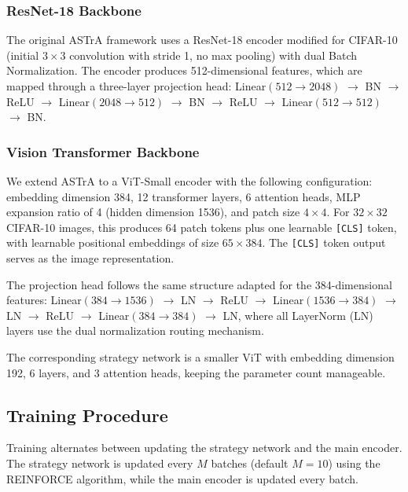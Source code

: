 \documentclass[conference]{IEEEtran}
\begin{document}
\subsubsection{ResNet-18 Backbone}
The original ASTrA framework uses a ResNet-18 encoder modified for CIFAR-10 (initial $3 \times 3$ convolution with stride 1, no max pooling) with dual Batch Normalization. The encoder produces 512-dimensional features, which are mapped through a three-layer projection head: Linear$(512 \rightarrow 2048)$ $\rightarrow$ BN $\rightarrow$ ReLU $\rightarrow$ Linear$(2048 \rightarrow 512)$ $\rightarrow$ BN $\rightarrow$ ReLU $\rightarrow$ Linear$(512 \rightarrow 512)$ $\rightarrow$ BN.

\subsubsection{Vision Transformer Backbone}
We extend ASTrA to a ViT-Small encoder with the following configuration: embedding dimension 384, 12 transformer layers, 6 attention heads, MLP expansion ratio of 4 (hidden dimension 1536), and patch size $4 \times 4$. For $32 \times 32$ CIFAR-10 images, this produces 64 patch tokens plus one learnable \texttt{[CLS]} token, with learnable positional embeddings of size $65 \times 384$. The \texttt{[CLS]} token output serves as the image representation.

The projection head follows the same structure adapted for the 384-dimensional features: Linear$(384 \rightarrow 1536)$ $\rightarrow$ LN $\rightarrow$ ReLU $\rightarrow$ Linear$(1536 \rightarrow 384)$ $\rightarrow$ LN $\rightarrow$ ReLU $\rightarrow$ Linear$(384 \rightarrow 384)$ $\rightarrow$ LN, where all LayerNorm (LN) layers use the dual normalization routing mechanism.

The corresponding strategy network is a smaller ViT with embedding dimension 192, 6 layers, and 3 attention heads, keeping the parameter count manageable.

\subsection{Training Procedure}

Training alternates between updating the strategy network and the main encoder. The strategy network is updated every $M$ batches (default $M = 10$) using the REINFORCE algorithm, while the main encoder is updated every batch.
\end{document}
